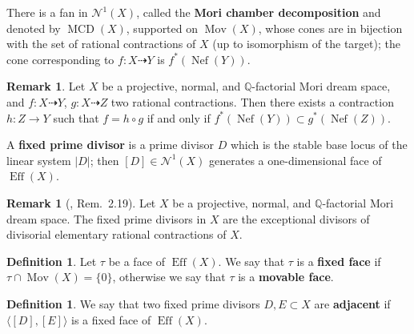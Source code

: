 \documentclass[a4paper,12pt]{amsart}
\theoremstyle{definition}
\newtheorem{definition}[thm]{Definition}
\newtheorem{remark}[thm]{Remark}
\numberwithin{figure}{section}
\numberwithin{table}{section}
\newcommand{\Q}{\mathbb{Q}}
\newcommand{\Nu}{\mathcal{N}^1}
\newcommand{\Eff}{\operatorname{Eff}}
\newcommand{\Nef}{\operatorname{Nef}}
\newcommand{\Mov}{\operatorname{Mov}}
\newcommand{\MCD}{\operatorname{MCD}}
\begin{document}
    There is a fan in $\Nu(X)$, called the {\bf Mori chamber decomposition} and denoted by $\MCD(X)$, supported on $\Mov(X)$, whose cones are in bijection with the set of rational contractions of $X$ (up to isomorphism of the target); the cone corresponding to $f\colon X\dasharrow Y$ is $f^*(\Nef(Y))$.
    \begin{remark}\label{factor}
Let $X$ be a projective, normal, and $\Q$-factorial Mori dream space, and $f\colon X\dasharrow Y$, $g\colon X\dasharrow Z$ two rational contractions. Then there exists a contraction $h\colon Z\to Y$ such that $f=h\circ g$ if and only if $f^*(\Nef(Y))\subset g^*(\Nef(Z))$.
    \end{remark}  
   A {\bf fixed prime divisor} is a prime divisor $D$ which is the stable base locus of the linear system
   $|D|$; then $[D]\in\Nu(X)$ generates a one-dimensional face of $\Eff(X)$.
   \begin{remark}[\cite{eff}, Rem.~2.19]\label{fixedprime}  Let $X$ be a projective, normal, and $\Q$-factorial Mori dream space.  The fixed prime divisors in $X$ are the exceptional divisors of divisorial elementary rational contractions of $X$.
     \end{remark}
   \begin{definition}\label{fmface}
Let $\tau$ be a face of $\Eff(X)$. We say that $\tau$ is a {\bf fixed face} if $\tau\cap\Mov(X)=\{0\}$, otherwise we say that $\tau$ is a {\bf movable face}.
\end{definition}
\begin{definition}\label{padj}
We say that two fixed prime divisors $D,E\subset X$ are {\bf adjacent} if $\langle [D],[E]\rangle$ is a fixed face of $\Eff(X)$.
   \end{definition}  
  
\end{document}
